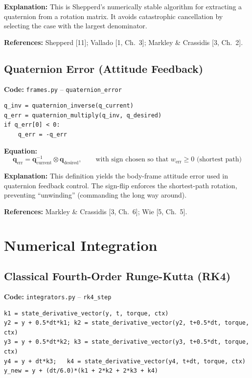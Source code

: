 \documentclass[12pt,a4paper]{article}
\begin{document}
\textbf{Explanation:} This is Shepperd's numerically stable algorithm for extracting a quaternion from a rotation matrix. It avoids catastrophic cancellation by selecting the case with the largest denominator.

\textbf{References:} Shepperd [11]; Vallado [1, Ch.~3]; Markley \& Crassidis [3, Ch.~2].

\subsection{Quaternion Error (Attitude Feedback)}

\textbf{Code:} \texttt{frames.py} – \texttt{quaternion\_error}
\begin{verbatim}
q_inv = quaternion_inverse(q_current)
q_err = quaternion_multiply(q_inv, q_desired)
if q_err[0] < 0:
    q_err = -q_err
\end{verbatim}

\textbf{Equation:}
\[
\mathbf{q}_{\text{err}} = \mathbf{q}_{\text{current}}^{-1} \otimes \mathbf{q}_{\text{desired}},\qquad \text{with sign chosen so that } w_{\text{err}} \ge 0 \text{ (shortest path)}
\]

\textbf{Explanation:} This definition yields the body-frame attitude error used in quaternion feedback control. The sign-flip enforces the shortest-path rotation, preventing ``unwinding'' (commanding the long way around).

\textbf{References:} Markley \& Crassidis [3, Ch.~6]; Wie [5, Ch.~5].

\section{Numerical Integration}

\subsection{Classical Fourth-Order Runge-Kutta (RK4)}

\textbf{Code:} \texttt{integrators.py} – \texttt{rk4\_step}
\begin{verbatim}
k1 = state_derivative_vector(y, t, torque, ctx)
y2 = y + 0.5*dt*k1; k2 = state_derivative_vector(y2, t+0.5*dt, torque, ctx)
y3 = y + 0.5*dt*k2; k3 = state_derivative_vector(y3, t+0.5*dt, torque, ctx)
y4 = y + dt*k3;   k4 = state_derivative_vector(y4, t+dt, torque, ctx)
y_new = y + (dt/6.0)*(k1 + 2*k2 + 2*k3 + k4)
\end{verbatim}
\end{document}
